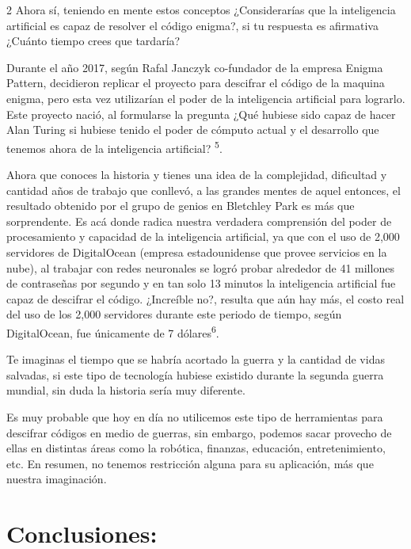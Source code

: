 \documentclass[12pt,spanish,Letterpaper,openany]{book}
\begin{document}
\begin {multicols}{2}
Ahora sí, teniendo en mente estos conceptos ¿Considerarías que la inteligencia artificial es capaz de resolver el código enigma?, si tu respuesta es afirmativa ¿Cuánto tiempo crees que tardaría?

Durante el año 2017, según Rafal Janczyk co-fundador de la empresa Enigma Pattern, decidieron replicar el proyecto para descifrar el código de la maquina enigma, pero esta vez utilizarían el poder de la inteligencia artificial para lograrlo. Este proyecto nació, al formularse la pregunta ¿Qué hubiese sido capaz de hacer Alan Turing si hubiese tenido el poder de cómputo actual y el desarrollo que tenemos ahora de la inteligencia artificial? \textsuperscript{5}.

Ahora que conoces la historia y tienes una idea de la complejidad, dificultad y cantidad años de trabajo que conllevó, a las grandes mentes de aquel entonces, el resultado obtenido por el grupo de genios en Bletchley Park es más que sorprendente. Es acá donde radica nuestra verdadera comprensión del poder de procesamiento y capacidad de la inteligencia artificial, ya que con el uso de 2,000 servidores de DigitalOcean (empresa estadounidense que provee servicios en la nube), al trabajar con redes neuronales se logró probar alrededor de 41 millones de contraseñas por segundo y en tan solo 13 minutos la inteligencia artificial fue capaz de descifrar el código. ¿Increíble no?, resulta que aún hay más, el costo real del uso de los 2,000 servidores durante este periodo de tiempo, según DigitalOcean, fue únicamente de 7 dólares\textsuperscript{6}.

Te imaginas el tiempo que se habría acortado la guerra y la cantidad de vidas salvadas, si este tipo de tecnología hubiese existido durante la segunda guerra mundial, sin duda la historia sería muy diferente.

Es muy probable que hoy en día no utilicemos este tipo de herramientas para descifrar códigos en medio de guerras, sin embargo, podemos sacar provecho de ellas en distintas áreas como la robótica, finanzas, educación, entretenimiento, etc. En resumen, no tenemos restricción alguna para su aplicación, más que nuestra imaginación.

\hypertarget{conclusiones-5}{%
\section{Conclusiones:}\label{conclusiones-5}}


\end{multicols}
\end{document}
